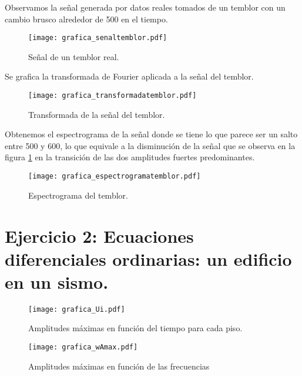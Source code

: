 \documentclass[11pt,letterpaper]{exam}
\begin{document}
Observamos la señal generada por datos reales tomados de un temblor con un cambio brusco alrededor de 500 en el tiempo. \\
\begin{figure}[H]
\centering
\texttt{[image: grafica\_senaltemblor.pdf]}
\caption{Señal de un temblor real.}
\label{fig4}
\end{figure}

Se grafica la transformada de Fourier aplicada a la señal del temblor.\\
\begin{figure}[H]
\centering
\texttt{[image: grafica\_transformadatemblor.pdf]}
\caption{Transformada de la señal del temblor.}
\label{fig5}
\end{figure}

Obtenemos el espectrograma de la señal donde se tiene lo que parece ser un salto entre 500 y 600, lo que equivale a la disminución de la señal que se observa en la figura \ref{fig4} en la transición de las dos amplitudes fuertes predominantes. \\
\begin{figure}[H]
\centering
\texttt{[image: grafica\_espectrogramatemblor.pdf]}
\caption{Espectrograma del temblor.}
\label{fig6}
\end{figure}

\noindent
\section{Ejercicio 2: Ecuaciones diferenciales ordinarias: un edificio en un sismo.}

\begin{figure}[H]
\centering
\texttt{[image: grafica\_Ui.pdf]}
\caption{Amplitudes máximas en función del tiempo para cada piso.}
\label{fig7}
\end{figure}

\begin{figure}[H]
\centering
\texttt{[image: grafica\_wAmax.pdf]}
\caption{Amplitudes máximas en función de las frecuencias}
\label{fig8}
\end{figure}
\end{document}
